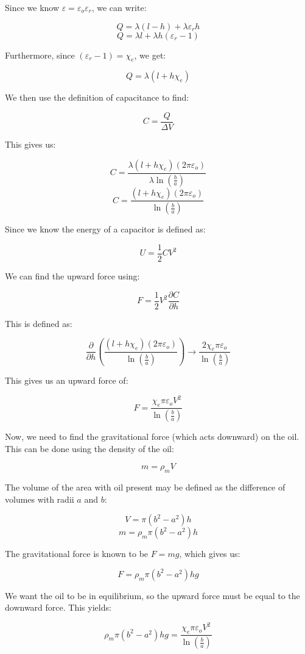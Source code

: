 \begin{enumerate}
    Since we know $\varepsilon=\varepsilon_o\varepsilon_r$, we can write:

    $$Q=\lambda(l-h)+\lambda\varepsilon_r h$$
    $$Q=\lambda l+\lambda h(\varepsilon_r-1)$$

    Furthermore, since $(\varepsilon_r-1)=\chi_e$, we get:

    $$Q=\lambda (l+h\chi_e)$$

    We then use the definition of capacitance to find:

    $$C=\frac{Q}{\Delta V}$$

    This gives us:

    $$C=\frac{\lambda(l+h\chi_e)(2\pi\varepsilon_o)}{\lambda\ln\left( \frac{b}{a} \right)}$$
    $$C=\frac{(l+h\chi_e)(2\pi\varepsilon_o)}{\ln\left( \frac{b}{a} \right)}$$

    Since we know the energy of a capacitor is defined as:

    $$U=\frac{1}{2}CV^2$$

    We can find the upward force using:

    $$F=\frac{1}{2}V^2\frac{\partial C}{\partial h}$$

    This is defined as:

    $$\frac{\partial}{\partial h}\left( \frac{(l+h\chi_e)(2\pi\varepsilon_o)}{\ln\left( \frac{b}{a} \right)} \right)\to\frac{2\chi_e\pi\varepsilon_o}{\ln\left( \frac{b}{a} \right)}$$

    This gives us an upward force of:

    $$F=\frac{\chi_e\pi\varepsilon_oV^2}{\ln\left( \frac{b}{a} \right)}$$

    Now, we need to find the gravitational force (which acts downward) on the oil. This can be done using the density of the oil:

    $$m=\rho_mV$$

    The volume of the area with oil present may be defined as the difference of volumes with radii $a$ and $b$:

    $$V=\pi(b^2-a^2)h$$
    $$m=\rho_m\pi\left( b^2-a^2 \right)h$$

    The gravitational force is known to be $F=mg$, which gives us:

    $$F=\rho_m\pi\left( b^2-a^2 \right)hg$$

    We want the oil to be in equilibrium, so the upward force must be equal to the downward force. This yields:

    $$\rho_m\pi\left( b^2-a^2 \right)hg=\frac{\chi_e\pi\varepsilon_oV^2}{\ln\left( \frac{b}{a} \right)}$$


\end{enumerate}
